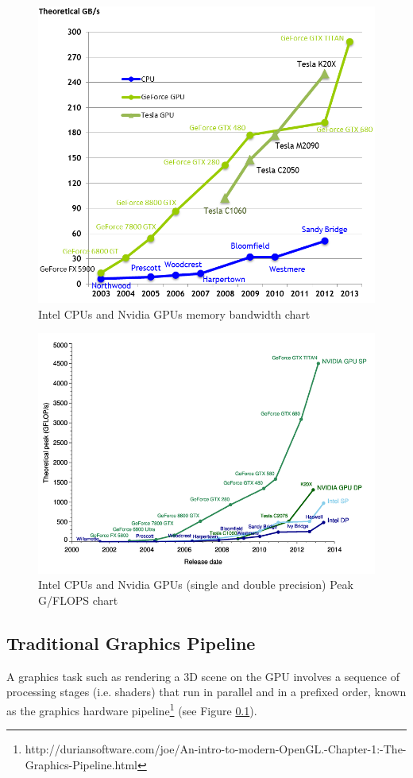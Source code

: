 \begin{figure}
\centering
\includegraphics[scale=0.4]{./images/memory-bandwidth}
\caption{Intel CPUs and Nvidia GPUs memory bandwidth
chart}\label{CPU-VS-GPU_MEMORY}
\end{figure}
\begin{figure}
\centering
\includegraphics[scale=0.4]{./images/cpu-vs-gpu}
\caption[Intel CPUs and Nvidia GPUs Peak G/FLOPS chart]{Intel CPUs and Nvidia
GPUs (single and double precision) Peak G/FLOPS chart}\label{CPU-VS-GPU_GFLOP}
\end{figure}


\subsection{Traditional Graphics Pipeline}\label{graphicPipeline}
A graphics task such as rendering a 3D scene on the GPU
involves a sequence of processing stages (i.e. shaders) that run in parallel
and in a prefixed order, known as the graphics hardware
pipeline\footnote{http://duriansoftware.com/joe/An-intro-to-modern-OpenGL.-Chapter-1:-The-Graphics-Pipeline.html}
(see Figure \ref{graphicPipeline}).


